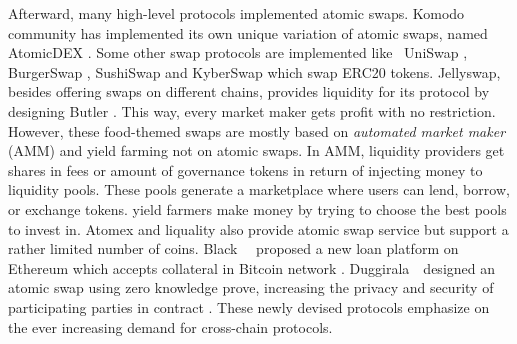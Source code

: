 Afterward, many high-level protocols implemented atomic swaps. Komodo community has implemented its own unique variation of atomic swaps, named AtomicDEX \cite{AtomicDEX}. Some other swap protocols are implemented like \eg~UniSwap \cite{adams2020uniswap}, BurgerSwap \cite{burger}, SushiSwap \cite{sushi} and KyberSwap \cite{kyberswap} which swap ERC20 tokens. Jellyswap, besides offering swaps on different chains, provides liquidity for its protocol by designing Butler \cite{butler}. This way, every market maker gets profit with no restriction. However, these food-themed swaps are mostly based on \emph{automated market maker} (AMM) and yield farming not on atomic swaps. In AMM, liquidity providers get shares in fees or amount of governance tokens in return of injecting money to liquidity pools. These pools generate a marketplace where users can lend, borrow, or exchange tokens. yield farmers make money by trying to choose the best pools to invest in. Atomex \cite{atomex} and liquality \cite{liq} also provide atomic swap service but support a rather limited number of coins. Black~\etal~ proposed a new loan platform on Ethereum which accepts collateral in Bitcoin network \cite{black2019atomic}. Duggirala~\etal~designed an atomic swap using zero knowledge prove, increasing the privacy and security of participating parties in contract \cite{zk-sw}.
These newly devised protocols emphasize on the ever increasing demand for cross-chain protocols. 


